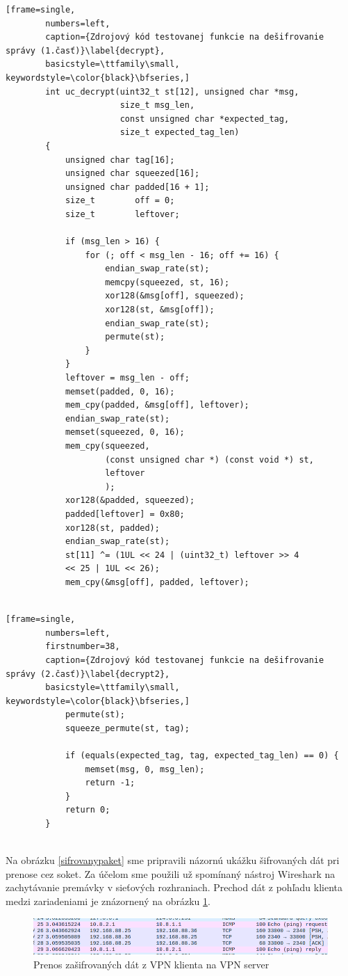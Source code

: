 \begin{minipage}{\textwidth} 	
	\begin{lstlisting}[frame=single,
		numbers=left,
		caption={Zdrojový kód testovanej funkcie na dešifrovanie správy (1.časť)}\label{decrypt},
		basicstyle=\ttfamily\small, keywordstyle=\color{black}\bfseries,]
		int uc_decrypt(uint32_t st[12], unsigned char *msg, 
		               size_t msg_len, 
		               const unsigned char *expected_tag,
		               size_t expected_tag_len)
		{
			unsigned char tag[16];
			unsigned char squeezed[16];
			unsigned char padded[16 + 1];
			size_t        off = 0;
			size_t        leftover;
			
			if (msg_len > 16) {
				for (; off < msg_len - 16; off += 16) {
					endian_swap_rate(st);
					memcpy(squeezed, st, 16);
					xor128(&msg[off], squeezed);
					xor128(st, &msg[off]);
					endian_swap_rate(st);
					permute(st);
				}
			}
			leftover = msg_len - off;
			memset(padded, 0, 16);
			mem_cpy(padded, &msg[off], leftover);
			endian_swap_rate(st);
			memset(squeezed, 0, 16);
			mem_cpy(squeezed, 
			        (const unsigned char *) (const void *) st, 
			        leftover
			        );
		    xor128(&padded, squeezed);
			padded[leftover] = 0x80;
			xor128(st, padded);
			endian_swap_rate(st);
			st[11] ^= (1UL << 24 | (uint32_t) leftover >> 4 
			<< 25 | 1UL << 26);
			mem_cpy(&msg[off], padded, leftover);
			
	\end{lstlisting}
\end{minipage}

\begin{minipage}{\textwidth} 	
	\begin{lstlisting}[frame=single,
		numbers=left,
		firstnumber=38,
		caption={Zdrojový kód testovanej funkcie na dešifrovanie správy (2.časť)}\label{decrypt2},
		basicstyle=\ttfamily\small, keywordstyle=\color{black}\bfseries,]
			permute(st);
			squeeze_permute(st, tag);
			
			if (equals(expected_tag, tag, expected_tag_len) == 0) {
				memset(msg, 0, msg_len);
				return -1;
			}
			return 0;
		}
	\end{lstlisting}
\end{minipage}\\

Na obrázku \ref{sifrovanypaket} sme pripravili názornú ukážku šifrovaných dát pri prenose cez soket. Za účelom sme použili už spomínaný nástroj Wireshark na zachytávanie premávky v sieťových rozhraniach. Prechod dát z pohľadu klienta medzi zariadeniami je znázornený na obrázku \ref{wiresharkpakety}. 
\begin{figure}[h!]
	\centering
	\includegraphics[width=1\textwidth]{figures/wiresharkpakety}
	\caption{Prenos zašifrovaných dát z VPN klienta na VPN server}
	\label{wiresharkpakety}
\end{figure}

